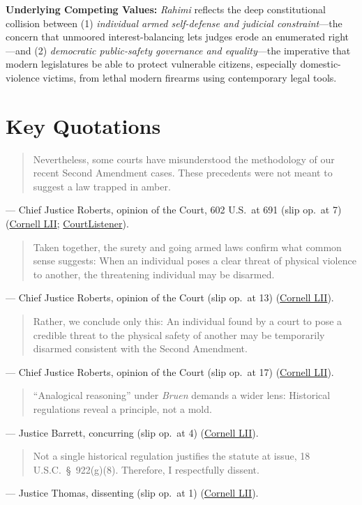 \documentclass[12pt]{article}
\begin{document}
\textbf{Underlying Competing Values:} \textit{Rahimi} reflects the deep constitutional collision between (1) \textit{individual armed self-defense and judicial constraint}---the concern that unmoored interest-balancing lets judges erode an enumerated right---and (2) \textit{democratic public-safety governance and equality}---the imperative that modern legislatures be able to protect vulnerable citizens, especially domestic-violence victims, from lethal modern firearms using contemporary legal tools.

\section{Key Quotations}

\begin{quote}
Nevertheless, some courts have misunderstood the methodology of our recent Second Amendment cases. These precedents were not meant to suggest a law trapped in amber.
\end{quote}
--- Chief Justice Roberts, opinion of the Court, 602 U.S.\ at 691 (slip op.\ at 7) (\href{https://www.law.cornell.edu/supremecourt/text/22-915}{Cornell LII}; \href{https://www.courtlistener.com/opinion/10600058/united-states-v-rahimi/}{CourtListener}).

\begin{quote}
Taken together, the surety and going armed laws confirm what common sense suggests: When an individual poses a clear threat of physical violence to another, the threatening individual may be disarmed.
\end{quote}
--- Chief Justice Roberts, opinion of the Court (slip op.\ at 13) (\href{https://www.law.cornell.edu/supremecourt/text/22-915}{Cornell LII}).

\begin{quote}
Rather, we conclude only this: An individual found by a court to pose a credible threat to the physical safety of another may be temporarily disarmed consistent with the Second Amendment.
\end{quote}
--- Chief Justice Roberts, opinion of the Court (slip op.\ at 17) (\href{https://www.law.cornell.edu/supremecourt/text/22-915}{Cornell LII}).

\begin{quote}
``Analogical reasoning'' under \textit{Bruen} demands a wider lens: Historical regulations reveal a principle, not a mold.
\end{quote}
--- Justice Barrett, concurring (slip op.\ at 4) (\href{https://www.law.cornell.edu/supremecourt/text/22-915}{Cornell LII}).

\begin{quote}
Not a single historical regulation justifies the statute at issue, 18 U.S.C.\ \S\ 922(g)(8). Therefore, I respectfully dissent.
\end{quote}
--- Justice Thomas, dissenting (slip op.\ at 1) (\href{https://www.law.cornell.edu/supremecourt/text/22-915}{Cornell LII}).
\end{document}
